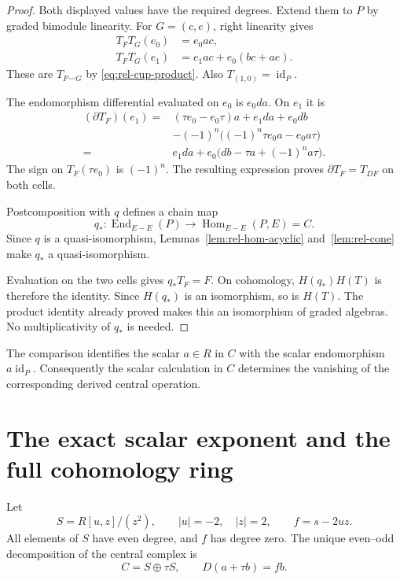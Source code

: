 \begin{proof}
Both displayed values have the required degrees.
Extend them to $P$ by graded bimodule linearity.
For $G=(c,e)$, right linearity gives
\[
 \begin{split}
 T_FT_G(e_0)&=e_0ac,\\
 T_FT_G(e_1)&=e_1ac+e_0(bc+ae).
 \end{split}
\]
These are $T_{F\smile G}$ by
\eqref{eq:rel-cup-product}. Also $T_{(1,0)}=\operatorname{id}_P$.

The endomorphism differential evaluated on $e_0$ is $e_0da$.
On $e_1$ it is
\[
 \begin{split}
 (\partial T_F)(e_1)
  ={}&(\tau e_0-e_0\tau)a+e_1da+e_0db\\
     &-(-1)^n\bigl((-1)^n\tau e_0a-e_0a\tau\bigr)\\
  ={}&e_1da+e_0\bigl(db-\tau a+(-1)^n a\tau\bigr).
 \end{split}
\]
The sign on $T_F(\tau e_0)$ is $(-1)^n$.
The resulting expression proves $\partial T_F=T_{DF}$ on both cells.

Postcomposition with $q$ defines a chain map
\[
 q_*:\operatorname{End}_{E-E}(P)\longrightarrow
           \operatorname{Hom}_{E-E}(P,E)=C.
\]
Since $q$ is a quasi-isomorphism, Lemmas~\ref{lem:rel-hom-acyclic}
and~\ref{lem:rel-cone} make $q_*$ a quasi-isomorphism.

Evaluation on the two cells gives $q_*T_F=F$.
On cohomology, $H(q_*)H(T)$ is therefore the identity.
Since $H(q_*)$ is an isomorphism, so is $H(T)$.
The product identity already proved makes this an isomorphism of graded
algebras. No multiplicativity of $q_*$ is needed.
\end{proof}

The comparison identifies the scalar $a\in R$ in $C$ with the scalar
endomorphism $a\operatorname{id}_P$.
Consequently the scalar calculation in $C$ determines the vanishing of
the corresponding derived central operation.

\section{The exact scalar exponent and the full cohomology ring}
\label{sec:rel-center-cohomology}

Let
\[
 S=R[u,z]/(z^2),\qquad |u|=-2,\quad |z|=2,
 \qquad f=s-2uz.
\]
All elements of $S$ have even degree, and $f$ has degree zero.
The unique even--odd decomposition of the central complex is
\[
 C=S\oplus\tau S,\qquad D(a+\tau b)=fb.
\]

